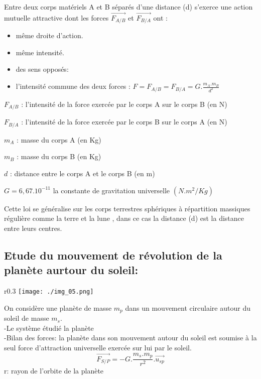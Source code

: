 \documentclass[12pt]{article}
\begin{document}
Entre deux corps matériels A et B séparés d'une distance (d) s'exerce une action mutuelle attractive dont les forces $\vec{F_{A/B}}$ et $\vec{F_{B/A}}$ ont : 

\begin{itemize}

	\item même droite d'action.
	\item même intensité.
	\item des sens opposés:
	\item l'intensité commune des deux forces : $F=F_{A/B} = F_{B/A} = G.\frac{m_A.m_B}{d^2}$
\end{itemize}

$F_{A/B}$ : l'intensité de la force exercée par le corps A sur le corps B (en N)

$F_{B/A}$ : l'intensité de la force exercée par le corps B sur le corps A (en N)

$m_A$ : masse du corps A (en Kg)

$m_B$ : masse du corps B (en Kg)

$d$ : distance entre le corps A et le corps B (en m)

$G = 6,67.10^{-11} $ la constante de gravitation universelle $(N.m^2/Kg)$

\begin{tcolorbox}
Cette loi se généralise sur les corps terrestres sphériques à répartition massiques régulière comme la terre et la lune , dans ce cas la distance (d) est la distance entre leurs centres.
\end{tcolorbox}

\subsection{Etude du mouvement de révolution de la planète aurtour du soleil:}
\begin{wrapfigure}{r}{0.3\textwidth}
	\vspace{-2cm}
	\texttt{[image: ./img\_05.png]}
\end{wrapfigure}

On considère une planète de masse $m_p$ dans un mouvement circulaire autour du soleil de masse $m_s$.
\\-Le système étudié {la planète}
\\-Bilan des forces: la planète dans son mouvement autour du soleil est soumise à la seul force d'attraction universelle
exercée sur lui par le soleil.
$$\vec{F_{S/P}} = -G.\frac{m_s.m_p}{r^2}.\vec{u_{sp}}$$ r: rayon de l'orbite de la planète
\end{document}
